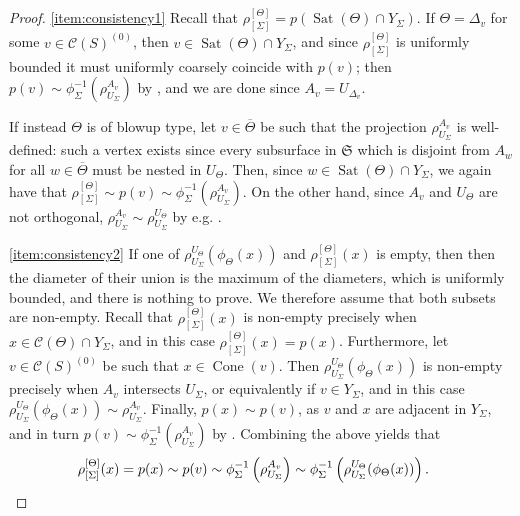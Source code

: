 \documentclass[svgnames]{amsart}
\theoremstyle{plain}
\theoremstyle{definition}
\newcommand{\frakS}{\mathfrak S}
\newcommand{\C}[1]{\mathcal{C}(#1)}
\newcommand{\Sat}{\operatorname{Sat}}
\newcommand{\Cone}[1]{\operatorname{Cone}\left(#1\right)}
\newcommand{\ov}[1]{\overline{#1}}
\begin{document}
    \begin{proof}
    \eqref{item:consistency1} Recall that $\rho^{[\Theta]}_{[\Sigma]}=p(\Sat(\Theta)\cap Y_\Sigma)$. If $\Theta=\Delta_v$ for some $v\in \C S^{(0)}$, then $v\in \Sat(\Theta)\cap Y_\Sigma$, and since $\rho^{[\Theta]}_{[\Sigma]}$ is uniformly bounded it must uniformly coarsely coincide with $p(v)$; then $ p(v)\sim \phi_\Sigma^{-1}\left(\rho^{A_v}_{U_\Sigma}\right)$ by , and we are done since $A_v=U_{\Delta_v}$. 
    
    If instead $\Theta$ is of blowup type, let $v\in \ov\Theta$ be such that the projection $\rho^{A_v}_{U_\Sigma}$ is well-defined: such a vertex exists since every subsurface in $\frakS$ which is disjoint from $A_w$ for all $w\in \ov\Theta$ must be nested in $U_\Theta$. Then, since $w\in \Sat(\Theta)\cap Y_\Sigma$, we again have that $\rho^{[\Theta]}_{[\Sigma]}\sim p(v)\sim \phi_\Sigma^{-1}\left(\rho^{A_v}_{U_\Sigma}\right)$. On the other hand, since $A_v$ and $U_\Theta$ are not orthogonal, $\rho^{A_v}_{U_\Sigma}\sim \rho^{U_\Theta}_{U_\Sigma}$ by e.g. \cite[Lemma 1.5]{DHS}. 
\par\medskip
    \eqref{item:consistency2} If one of $\rho^{U_\Theta}_{U_\Sigma}(\phi_\Theta(x))$ and $\rho^{[\Theta]}_{[\Sigma]}(x)$ is empty, then then the diameter of their union is the maximum of the diameters, which is uniformly bounded, and there is nothing to prove. We therefore assume that both subsets are non-empty. Recall that $\rho^{[\Theta]}_{[\Sigma]}(x)$ is non-empty precisely when $x\in \C{\Theta}\cap Y_\Sigma$, and in this case $\rho^{[\Theta]}_{[\Sigma]}(x)=p(x)$. Furthermore, let $v\in \C S^{(0)}$ be such that $x\in \Cone{v}$. Then $\rho^{U_\Theta}_{U_\Sigma}(\phi_\Theta(x))$ is non-empty precisely when $A_v$ intersects $U_\Sigma$, or equivalently if $v\in Y_\Sigma$, and in this case $\rho^{U_\Theta}_{U_\Sigma}(\phi_\Theta(x))\sim \rho^{A_v}_{U_\Sigma}$. Finally, $p(x)\sim p(v)$, as $v$ and $x$ are adjacent in $Y_\Sigma$, and in turn $p(v)\sim \phi_\Sigma^{-1}\left(\rho^{A_v}_{U_\Sigma}\right)$ by . Combining the above yields that 
    \begin{align*}\rho^{[\Theta]}_{[\Sigma]}(x)=p(x)\sim p(v) \sim \phi_\Sigma^{-1}\left(\rho^{A_v}_{U_\Sigma}\right)\sim \phi_\Sigma^{-1}\left(\rho^{U_\Theta}_{U_\Sigma}(\phi_\Theta(x))\right). &\qedhere
    \end{align*}
    \end{proof}
\end{document}
